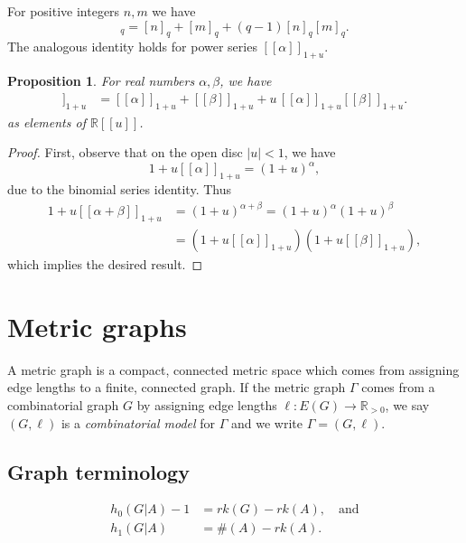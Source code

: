 \documentclass{amsart}
\newtheorem{prop}[thm]{Proposition}
\theoremstyle{definition}
\newcommand{\RR}{\mathbb{R}}
\newcommand{\RRpos}{\RR_{>0}}
\newcommand{\fanalog}[2]{[\![#2]\!]_{#1}}
\newcommand{\ufanalog}[1]{\fanalog{1 + u}{#1}}
\newcommand{\analog}[2]{[#2]_{#1}}
\begin{document}
For positive integers $n,m$ we have
\begin{equation*}
\analog{q}{n + m}
 = \analog{q}{n} + \analog{q}{m} + (q-1) \analog{q}{n} \analog{q}{m} .
\end{equation*}
The analogous identity holds for power series $\fanalog{1 + u}{\alpha}$.
\begin{prop}\label{prop:fanalog-add}
	For real numbers $\alpha,\beta$, we have
	\begin{align*}
	\fanalog{1 + u}{\alpha + \beta} 
	 &= \fanalog{1 + u}{\alpha} + \fanalog{1 + u}{\beta} + u \, \fanalog{1 + u}{\alpha} \fanalog{1 + u}{\beta} .
	\end{align*}
	as elements of $\RR[\![u]\!]$.
\end{prop}
\begin{proof}
First, observe that on the open disc $|u| < 1$, we have
\[
	1 + u \ufanalog{\alpha} = (1 + u)^\alpha,
\]
due to the binomial series identity.
Thus
\begin{align*}
	1 + u \ufanalog{\alpha + \beta} &= (1 + u)^{\alpha + \beta} 
	= (1 + u)^\alpha (1 + u)^\beta \\
	&= (1 + u \ufanalog{\alpha}) (1 + u \ufanalog{\beta}),
\end{align*}
which implies the desired result.
\end{proof}



\section{Metric graphs}

A metric graph is a compact, connected metric space which comes from 
assigning edge lengths to a finite, connected graph.
If the metric graph $\Gamma$ comes from a combinatorial graph $G$ by 
assigning edge lengths $\ell : E(G) \to \RRpos$,
we say $(G,\ell)$ is a {\em combinatorial model} for $\Gamma$
and we write $\Gamma = (G,\ell)$.

\subsection{Graph terminology}
\begin{align*}
h_0(G| A) - 1 &= rk(G) - rk(A), \quad\text{and}\\
h_1(G| A) &= \#(A) - rk(A) .
\end{align*}
\end{document}
